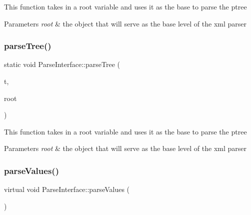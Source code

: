 This function takes in a root variable and uses it as the base to parse the ptree 
\begin{DoxyParams}{Parameters}
{\em root} & the object that will serve as the base level of the xml parser \\
\hline
\end{DoxyParams}
\mbox{\label{classParseInterface_a90a82d1495a227ed4fa757935c2843a8}} 
\subsubsection{\texorpdfstring{parse\+Tree()}{parseTree()}\hspace{0.1cm}{\footnotesize\ttfamily [3/3]}}
{\footnotesize\ttfamily static void Parse\+Interface\+::parse\+Tree (\begin{DoxyParamCaption}\item[{pt\+::ptree}]{t,  }\item[{\hyperlink{classRoot}{Root} $\ast$\&}]{root }\end{DoxyParamCaption})\hspace{0.3cm}{\ttfamily [static]}}

This function takes in a root variable and uses it as the base to parse the ptree 
\begin{DoxyParams}{Parameters}
{\em root} & the object that will serve as the base level of the xml parser \\
\hline
\end{DoxyParams}
\mbox{\label{classParseInterface_afca32108192ba0997c9e5a78189b0cbc}} 
\subsubsection{\texorpdfstring{parse\+Values()}{parseValues()}\hspace{0.1cm}{\footnotesize\ttfamily [1/3]}}
{\footnotesize\ttfamily virtual void Parse\+Interface\+::parse\+Values (\begin{DoxyParamCaption}{ }\end{DoxyParamCaption})\hspace{0.3cm}{\ttfamily [pure virtual]}}

